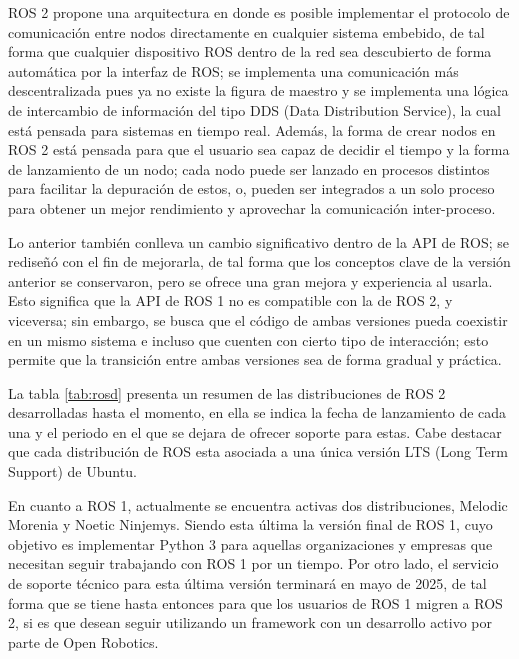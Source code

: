 ROS 2 propone una arquitectura en donde es posible implementar el protocolo de comunicación entre nodos directamente en cualquier sistema embebido, de tal forma que cualquier dispositivo ROS dentro de la red sea descubierto de forma automática por la interfaz de ROS; se implementa una comunicación más descentralizada pues ya no existe la figura de maestro y se implementa una lógica de intercambio de información del tipo DDS (Data Distribution Service), la cual está pensada para sistemas en tiempo real. Además, la forma de crear nodos en ROS 2 está pensada para que el usuario sea capaz de decidir el tiempo  y la forma de lanzamiento de un nodo; cada nodo puede ser lanzado en procesos distintos para facilitar la depuración de estos, o, pueden ser integrados a un solo proceso para obtener un mejor rendimiento y aprovechar la comunicación inter-proceso.  

Lo anterior también conlleva un cambio significativo dentro de la API de ROS; se rediseñó con el fin de mejorarla, de tal forma que los conceptos clave de la versión anterior se conservaron, pero se ofrece una gran mejora y experiencia al usarla. Esto significa que la API de ROS 1 no es compatible con la de ROS 2, y viceversa; sin embargo, se busca que el código de ambas versiones pueda coexistir en un mismo sistema e incluso que cuenten con cierto tipo de interacción; esto permite que la transición entre ambas versiones sea de forma gradual y práctica.

La tabla \ref{tab:rosd} presenta un resumen de las distribuciones de ROS 2 desarrolladas hasta el momento, en ella se indica la fecha de lanzamiento de cada una y el periodo en el que se dejara de ofrecer soporte para estas. Cabe destacar que cada distribución de ROS esta asociada a una única versión LTS (Long Term Support) de Ubuntu.

En cuanto a ROS 1, actualmente se encuentra activas dos distribuciones, Melodic Morenia y Noetic Ninjemys. Siendo esta última la versión final de ROS 1, cuyo objetivo es implementar Python 3 para aquellas organizaciones y empresas que necesitan seguir trabajando con ROS 1 por un tiempo. Por otro lado, el servicio de soporte técnico para esta última versión terminará en mayo de 2025, de tal forma que se tiene hasta entonces para que los usuarios de ROS 1 migren a ROS 2, si es que desean seguir utilizando un framework con un desarrollo activo por parte de Open Robotics.

